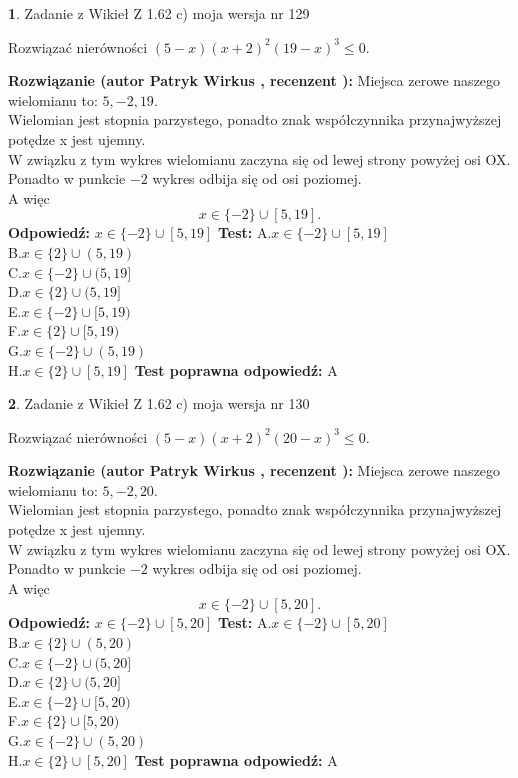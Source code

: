 \documentclass[12pt, a4paper]{article}
\theoremstyle{definition} %
\newtheorem{zad}{}
\newcommand{\zadStart}[1]{\begin{zad}#1\newline}
\newcommand{\zadStop}{\end{zad}}
\newcommand{\rozwStart}[2]{\noindent \textbf{Rozwiązanie (autor #1 , recenzent #2): }\newline}
\newcommand{\rozwStop}{\newline}
\newcommand{\odpStart}{\noindent \textbf{Odpowiedź:}\newline}
\newcommand{\odpStop}{\newline}
\newcommand{\testStart}{\noindent \textbf{Test:}\newline}
\newcommand{\testStop}{\newline}
\newcommand{\kluczStart}{\noindent \textbf{Test poprawna odpowiedź:}\newline}
\newcommand{\kluczStop}{\newline}
\begin{document}
\zadStart{Zadanie z Wikieł Z 1.62 c) moja wersja nr 129}

Rozwiązać nierówności $(5-x)(x+2)^{2}(19-x)^{3}\le0$.
\zadStop
\rozwStart{Patryk Wirkus}{}
Miejsca zerowe naszego wielomianu to: $5, -2, 19$.\\
Wielomian jest stopnia parzystego, ponadto znak współczynnika przy\linebreak najwyższej potędze x jest ujemny.\\ W związku z tym wykres wielomianu zaczyna się od lewej strony powyżej osi OX.\\
Ponadto w punkcie $-2$ wykres odbija się od osi poziomej.\\
A więc $$x \in \{-2\} \cup [5,19].$$
\rozwStop
\odpStart
$x \in \{-2\} \cup [5,19]$
\odpStop
\testStart
A.$x \in \{-2\} \cup [5,19]$\\
B.$x \in \{2\} \cup (5,19)$\\
C.$x \in \{-2\} \cup (5,19]$\\
D.$x \in \{2\} \cup (5,19]$\\
E.$x \in \{-2\} \cup [5,19)$\\
F.$x \in \{2\} \cup [5,19)$\\
G.$x \in \{-2\} \cup (5,19)$\\
H.$x \in \{2\} \cup [5,19]$
\testStop
\kluczStart
A
\kluczStop



\zadStart{Zadanie z Wikieł Z 1.62 c) moja wersja nr 130}

Rozwiązać nierówności $(5-x)(x+2)^{2}(20-x)^{3}\le0$.
\zadStop
\rozwStart{Patryk Wirkus}{}
Miejsca zerowe naszego wielomianu to: $5, -2, 20$.\\
Wielomian jest stopnia parzystego, ponadto znak współczynnika przy\linebreak najwyższej potędze x jest ujemny.\\ W związku z tym wykres wielomianu zaczyna się od lewej strony powyżej osi OX.\\
Ponadto w punkcie $-2$ wykres odbija się od osi poziomej.\\
A więc $$x \in \{-2\} \cup [5,20].$$
\rozwStop
\odpStart
$x \in \{-2\} \cup [5,20]$
\odpStop
\testStart
A.$x \in \{-2\} \cup [5,20]$\\
B.$x \in \{2\} \cup (5,20)$\\
C.$x \in \{-2\} \cup (5,20]$\\
D.$x \in \{2\} \cup (5,20]$\\
E.$x \in \{-2\} \cup [5,20)$\\
F.$x \in \{2\} \cup [5,20)$\\
G.$x \in \{-2\} \cup (5,20)$\\
H.$x \in \{2\} \cup [5,20]$
\testStop
\kluczStart
A
\kluczStop
\end{document}
